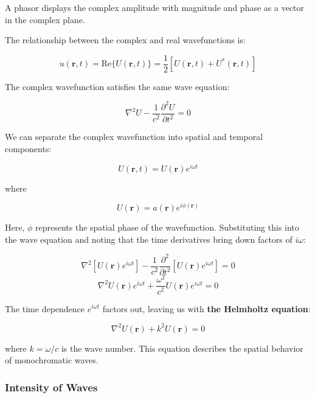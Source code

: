 \documentclass[
  a4paper,
]{book}
\begin{document}
\begin{tcolorbox}[enhanced jigsaw, coltitle=black, title=\textcolor{quarto-callout-note-color}{\faInfo}\hspace{0.5em}{Note}, colframe=quarto-callout-note-color-frame, toprule=.15mm, opacitybacktitle=0.6, left=2mm, opacityback=0, breakable, toptitle=1mm, bottomtitle=1mm, leftrule=.75mm, arc=.35mm, titlerule=0mm, colbacktitle=quarto-callout-note-color!10!white, rightrule=.15mm, bottomrule=.15mm, colback=white]

A phasor displays the complex amplitude with magnitude and phase as a
vector in the complex plane.

\end{tcolorbox}

The relationship between the complex and real wavefunctions is:

\[
u(\mathbf{r},t)=\text{Re}\{U(\mathbf{r},t)\}=\frac{1}{2}[U(\mathbf{r},t)+U^*(\mathbf{r},t)]
\]

The complex wavefunction satisfies the same wave equation:

\[
\nabla^2 U - \frac{1}{c^2}\frac{\partial^2 U}{\partial t^2}=0
\]

We can separate the complex wavefunction into spatial and temporal
components:

\[
U(\mathbf{r},t)=U(\mathbf{r})e^{i\omega t}
\]

where

\[
U(\mathbf{r})=a(\mathbf{r})e^{i\phi(\mathbf{r})}
\]

Here, \(\phi\) represents the spatial phase of the wavefunction.
Substituting this into the wave equation and noting that the time
derivatives bring down factors of \(i\omega\):

\[\nabla^2 [U(\mathbf{r})e^{i\omega t}] - \frac{1}{c^2}\frac{\partial^2}{\partial t^2}[U(\mathbf{r})e^{i\omega t}] = 0\]
\[\nabla^2 U(\mathbf{r})e^{i\omega t} + \frac{\omega^2}{c^2}U(\mathbf{r})e^{i\omega t} = 0\]

The time dependence \(e^{i\omega t}\) factors out, leaving us with
\textbf{the Helmholtz equation}:

\[\nabla^2 U(\mathbf{r}) + k^2U(\mathbf{r}) = 0\]

where \(k = \omega/c\) is the wave number. This equation describes the
spatial behavior of monochromatic waves.

\subsubsection{Intensity of Waves}\label{intensity-of-waves}
\end{document}
